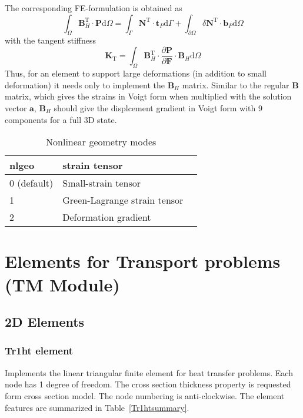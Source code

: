 \documentclass[a4paper]{article}
\begin{document}
The corresponding FE-formulation is obtained as
\begin{equation}
	\int_{\Omega} \mathbf{B}_H^{\mathrm{T}} \cdot \mathbf{P} \mathrm{d} \Omega = \int_{\Gamma} \mathbf{N}^{\mathrm{T}} \cdot \mathbf{t}_P  \mathrm{d} \Gamma
	+ \int_{\partial \Omega} \delta \mathbf{N}^{\mathrm{T}} \cdot \mathbf{b}_P  \mathrm{d} \Omega
\end{equation} 
with the tangent stiffness
\begin{equation}
	\mathbf{K}_{\mathrm{T}} = \int_{\Omega} \mathbf{B}_H^{\mathrm{T}} \cdot \frac{\partial \mathbf{P}}{\partial \mathbf{F} } \cdot \mathbf{B}_H \mathrm{d} \Omega 
\end{equation} 
Thus, for an element to support large deformations (in addition to small deformation) it needs only to implement the $\mathbf{B}_H$ matrix. 
Similar to the regular \textbf{B} matrix, which gives the strains in Voigt form when multiplied with the solution vector $\textbf{a}$, 
$\textbf{B}_H$ should give the displcement gradient in Voigt form with 9 components for a full 3D state.
%
\begin{table}
  \centering
  \begin{tabular}{lll}
    \hline
    nlgeo & strain tensor\\
    \hline
    0 (default) & Small-strain tensor\\
    1 & Green-Lagrange strain tensor\\
    2 & Deformation gradient\\
    \hline
  \end{tabular}
  \caption{Nonlinear geometry modes} \label{strain_tensor_table}
\end{table}

\clearpage
\section{Elements for Transport problems (TM Module)}
\subsection{2D Elements}
\subsubsection{Tr1ht element}
\label{Tr1ht}
Implements the linear triangular finite element for heat transfer problems. Each node has 1 degree of freedom.
The cross section thickness property is requested form cross section model.
The node numbering is anti-clockwise. The element features are summarized in Table~\ref{Tr1htsummary}.
\end{document}
